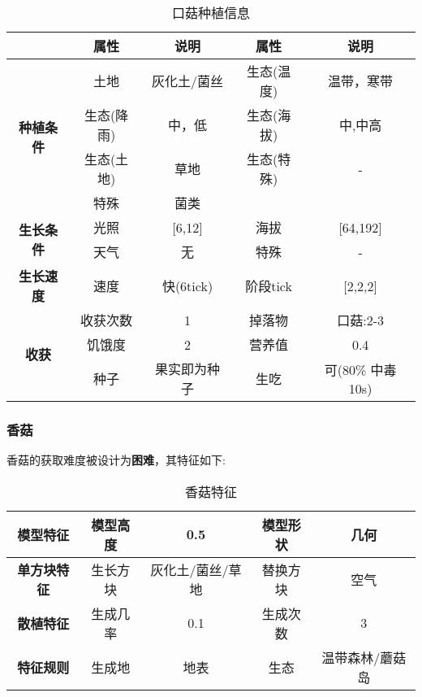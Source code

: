 \begin{table}[H]
    \centering
    \caption{口菇种植信息}
    \label{table:口菇种植信息}
    \setlength{\tabcolsep}{4mm}
    \begin{tabular}{c|cc|cc}
        \toprule
                                           & \textbf{属性} & \textbf{说明} & \textbf{属性} & \textbf{说明} \\
        \midrule
        \multirow{4}{*}{\textbf{种植条件}} & 土地          & 灰化土/菌丝          & 生态(温度)    & 温带，寒带    \\
                                           & 生态(降雨)    & 中，低        & 生态(海拔)    & 中,中高            \\
                                           & 生态(土地)    & 草地          & 生态(特殊)    & -             \\
                                           & 特殊          & 菌类           \\
        \midrule
        \multirow{2}{*}{\textbf{生长条件}} & 光照          & [6,12]        & 海拔          & [64,192]      \\
                                           & 天气          & 无            & 特殊          & -             \\
        \midrule
        \textbf{生长速度}                  & 速度          & 快(6tick)     & 阶段tick      & [2,2,2]       \\
        \midrule
        \multirow{3}{*}{\textbf{收获}}     & 收获次数      & 1             & 掉落物        & 口菇:2-3      \\
                                           & 饥饿度        & 2             & 营养值        & 0.4           \\
                                           & 种子          & 果实即为种子  & 生吃          & 可(80\% 中毒 10s)   \\
        \bottomrule
    \end{tabular}
\end{table}

\subsubsection{香菇}

香菇的获取难度被设计为\textbf{困难}，其特征如下:
\begin{table}[H]
    \centering
    \caption{香菇特征}
    \label{table:香菇特征}
    \setlength{\tabcolsep}{4mm}
    \begin{tabular}{c|cc|cc}
        \toprule
        \textbf{模型特征}   & 模型高度 & 0.5      & 模型形状 & 几何     \\
        \midrule
        \textbf{单方块特征} & 生长方块 & 灰化土/菌丝/草地 & 替换方块 & 空气     \\
        \midrule
        \textbf{散植特征}   & 生成几率 & 0.1   & 生成次数 & 3        \\
        \midrule
        \textbf{特征规则}   & 生成地   & 地表   & 生态     & 温带森林/蘑菇岛 \\
        \bottomrule
    \end{tabular}
\end{table}


